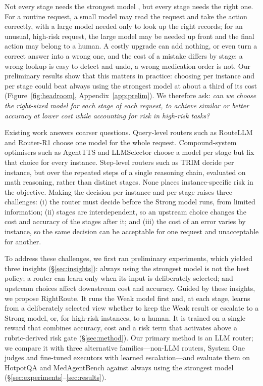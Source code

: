 \documentclass{article}
\begin{document}
Not every stage needs the strongest model \citep{mckinsey2026agents}, but every stage needs the right one. For a routine request, a small model may read the request and take the action correctly, with a large model needed only to look up the right records; for an unusual, high-risk request, the large model may be needed up front and the final action may belong to a human. A costly upgrade can add nothing, or even turn a correct answer into a wrong one, and the cost of a mistake differs by stage: a wrong lookup is easy to detect and undo, a wrong medication order is not. Our preliminary results show that this matters in practice: choosing per instance and per stage could beat always using the strongest model at about a third of its cost (Figure~\ref{fig:headroom}, Appendix~\ref{app:prelim}). We therefore ask: \emph{can we choose the right-sized model for each stage of each request, to achieve similar or better accuracy at lower cost while accounting for risk in high-risk tasks?}

Existing work answers coarser questions. Query-level routers such as RouteLLM \citep{ong2025routellm} and Router-R1 \citep{zhang2025routerr1} choose one model for the whole request. Compound-system optimisers such as AgentTTS \citep{wang2025agenttts} and LLMSelector \citep{chen2025llmselector} choose a model per stage but fix that choice for every instance. Step-level routers such as TRIM \citep{trim2026} decide per instance, but over the repeated steps of a single reasoning chain, evaluated on math reasoning, rather than distinct stages. None places instance-specific risk in the objective. Making the decision per instance and per stage raises three challenges: (i) the router must decide before the Strong model runs, from limited information; (ii) stages are interdependent, so an upstream choice changes the cost and accuracy of the stages after it; and (iii) the cost of an error varies by instance, so the same decision can be acceptable for one request and unacceptable for another.

To address these challenges, we first ran preliminary experiments, which yielded three insights (\S\ref{sec:insights}): always using the strongest model is not the best policy; a router can learn only when its input is deliberately selected; and upstream choices affect downstream cost and accuracy. Guided by these insights, we propose RightRoute. It runs the Weak model first and, at each stage, learns from a deliberately selected view whether to keep the Weak result or escalate to a Strong model, or, for high-risk instances, to a human. It is trained on a single reward that combines accuracy, cost and a risk term that activates above a rubric-derived risk gate (\S\ref{sec:method}). Our primary method is an LLM router; we compare it with three alternative families---non-LLM routers, System One judges and fine-tuned executors with learned escalation---and evaluate them on HotpotQA and MedAgentBench against always using the strongest model (\S\ref{sec:experiments}--\ref{sec:results}).
\end{document}

